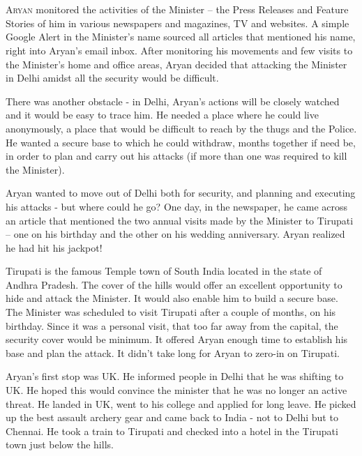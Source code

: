 \chapter{}

\lettrine{A}{ryan} monitored the activities of the Minister – the Press Releases and Feature
Stories of him in various newspapers and magazines, TV and websites. A simple
Google Alert in the Minister's name sourced all articles that mentioned his
name, right into Aryan's email inbox. After monitoring his movements and few
visits to the Minister's home and office areas, Aryan decided that attacking the
Minister in Delhi amidst all the security would be difficult.

There was another obstacle - in Delhi, Aryan's actions will be closely watched
and it would be easy to trace him. He needed a place where he could live
anonymously, a place that would be difficult to reach by the thugs and the
Police. He wanted a secure base to which he could withdraw, months together if
need be, in order to plan and carry out his attacks (if more than one was
required to kill the Minister).

Aryan wanted to move out of Delhi both for security, and planning and executing
his attacks - but where could he go? One day, in the newspaper, he came across
an article that mentioned the two annual visits made by the Minister to Tirupati
– one on his birthday and the other on his wedding anniversary. Aryan realized
he had hit his jackpot!

Tirupati is the famous Temple town of South India located in the state of Andhra
Pradesh. The cover of the hills would offer an excellent opportunity to hide and
attack the Minister. It would also enable him to build a secure base. The
Minister was scheduled to visit Tirupati after a couple of months, on his
birthday. Since it was a personal visit, that too far away from the capital, the
security cover would be minimum. It offered Aryan enough time to establish his
base and plan the attack. It didn't take long for Aryan to zero-in on Tirupati.

Aryan's first stop was UK. He informed people in Delhi that he was shifting to
UK. He hoped this would convince the minister that he was no longer an active
threat. He landed in UK, went to his college and applied for long leave. He
picked up the best assault archery gear and came back to India - not to Delhi
but to Chennai. He took a train to Tirupati and checked into a hotel in the
Tirupati town just below the hills.
